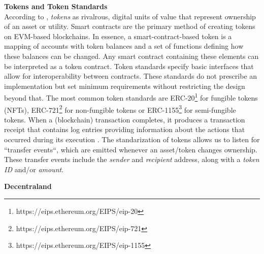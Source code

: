 \documentclass[12pt,a4paper,titlepage,oneside,english]{article}
\begin{document}
\textbf{Tokens and Token Standards}\\
According to \cite{roth2019tokenization}, \textit{tokens} as rivalrous, digital units of value that represent ownership of an asset or utility. Smart contracts are the primary method of creating tokens on EVM-based blockchains. In essence, a smart-contract-based token is a mapping of accounts with token balances and a set of functions defining how these balances can be changed. Any smart contract containing these elements can be interpreted as a token contract. \citep{roth2019tokenization} \newline
Token standards specify basic interfaces that allow for interoperability between contracts. These standards do not prescribe an implementation but set minimum requirements without restricting the design beyond that. 
The most common token standards are ERC-20\footnote{https://eips.ethereum.org/EIPS/eip-20} for fungible tokens (NFTs), ERC-721\footnote{https://eips.ethereum.org/EIPS/eip-721} for non-fungible tokens or ERC-1155\footnote{https://eips.ethereum.org/EIPS/eip-1155} for semi-fungible tokens.\newline
When a (blockchain) transaction completes, it produces a transaction receipt that contains log entries providing information about the actions that occurred during its execution \citep{mastering_ethereum}. The standarization of tokens allows us to listen for ``transfer events``, which are emitted whenever an asset/token changes ownership.
These transfer events include the \textit{sender} and \textit{recipient} address, along with a \textit{token ID} and/or \textit{amount}. 




\textbf{Decentraland} \\
\end{document}
